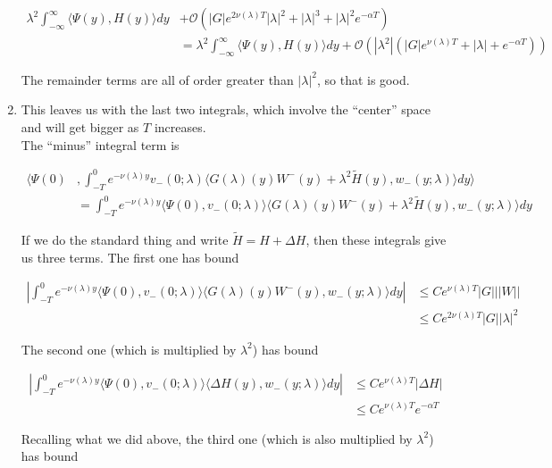 \documentclass[12pt]{article}
\begin{document}
\begin{enumerate}
\begin{align*}
\lambda^2 \int_{-\infty}^\infty \langle \Psi(y), H(y) \rangle dy &+ \mathcal{O}( |G| e^{2 \nu(\lambda)T}|\lambda|^2 + |\lambda|^3 + |\lambda|^2 e^{-\alpha T}) \\
&= \lambda^2 \int_{-\infty}^\infty \langle \Psi(y), H(y) \rangle dy + \mathcal{O}( |\lambda^2|(|G| e^{\nu(\lambda)T} + |\lambda|+ e^{-\alpha T}))
\end{align*}

The remainder terms are all of order greater than $|\lambda|^2$, so that is good.

\item This leaves us with the last two integrals, which involve the ``center'' space and will get bigger as $T$ increases.\\

The ``minus'' integral term is

\begin{align*}
\langle \Psi(0) &, \int_{-T}^0 
e^{-\nu(\lambda)y} v_-(0; \lambda) \langle G(\lambda)(y)W^-(y) + \lambda^2 \tilde{H}(y), w_-(y; \lambda) \rangle dy \rangle \\
&= \int_{-T}^0 e^{-\nu(\lambda)y} \langle \Psi(0),v_-(0; \lambda) \rangle
\langle G(\lambda)(y)W^-(y) + \lambda^2 \tilde{H}(y), w_-(y; \lambda) \rangle dy 
\end{align*}

If we do the standard thing and write $\tilde{H} = H + \Delta H$, then these integrals give us three terms. The first one has bound

\begin{align*}
\left| \int_{-T}^0 e^{-\nu(\lambda)y} \langle \Psi(0),v_-(0; \lambda) \rangle
\langle G(\lambda)(y)W^-(y), w_-(y; \lambda) \rangle dy \right| 
&\leq C e^{\nu(\lambda)T} |G| ||W|| \\
&\leq C e^{2\nu(\lambda)T} |G| |\lambda|^2
\end{align*}

The second one (which is multiplied by $\lambda^2$) has bound

\begin{align*}
\left| \int_{-T}^0 e^{-\nu(\lambda)y} \langle \Psi(0), v_-(0; \lambda) \rangle
\langle \Delta H(y), w_-(y; \lambda) \rangle dy \right| 
&\leq C e^{\nu(\lambda)T} |\Delta H| \\
&\leq C e^{\nu(\lambda)T} e^{-\alpha T}
\end{align*}

Recalling what we did above, the third one (which is also multiplied by $\lambda^2$) has bound


\end{enumerate}
\end{document}
